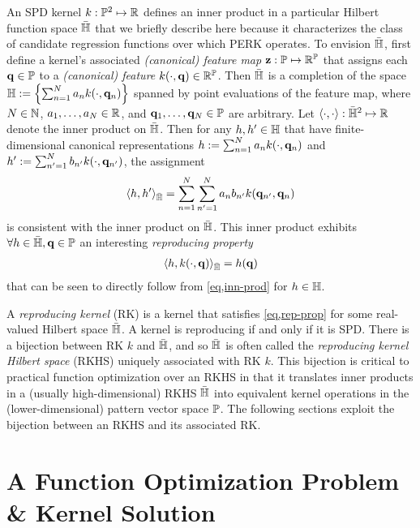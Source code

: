 An SPD kernel $k : \mathbb{P}^2 \mapsto \mathbb{R}$
defines an inner product 
in a particular Hilbert function space ${\bar{\mathbb{H}}}$
that we briefly describe here
because it characterizes
the class of candidate regression functions
over which PERK operates.
To envision ${\bar{\mathbb{H}}}$,
first define a kernel's associated \emph{(canonical) feature map} 
$\mathbf{z} : \mathbb{P} \mapsto \mathbb{R}^{\mathbb{P}}$
that assigns each $\mathbf{q} \in \mathbb{P}$ 
to a \emph{(canonical) feature} $k\paren{\cdot,\bmq} \in \reals{\setQ}$.
Then ${\bar{\mathbb{H}}}$ is a completion 
of the space $\setH := \set{\sum_{n=1}^N a_n k\paren{\cdot,\bmq_n}}$
spanned by point evaluations
of the feature map,
where
$N \in \mathbb{N}$,
$a_1,\dots,a_N \in \mathbb{R}$,
and
$\mathbf{q}_1,\dots,\mathbf{q}_N \in \mathbb{P}$ are arbitrary.
Let $\langle \cdot,\cdot \rangle : {\bar{\mathbb{H}}}^2 \mapsto \mathbb{R}$ 
denote the inner product on ${\bar{\mathbb{H}}}$.
Then for any $h,h' \in \mathbb{H}$
that have finite-dimensional canonical representations
$h := \sum_{n=1}^N a_n k\paren{\cdot,\bmq_n}$ 
and
$h' := \sum_{n'=1}^N b_{n'} k\paren{\cdot,\bmq_{n'}}$,
the assignment
\begin{align}
	\innprod{h}{h'}_\rkhs =
		\sum_{n=1}^N \sum_{n'=1}^N a_n b_{n'} k\paren{\bmq_{n'},\bmq_n}
	\label{eq,inn-prod}
\end{align}
is consistent
with the inner product on ${\bar{\mathbb{H}}}$.
This inner product exhibits $\forall h\in{\bar{\mathbb{H}}}, \mathbf{q}\in\mathbb{P}$
an interesting \emph{reproducing property}
\begin{align}
	\innprod{h}{k\paren{\cdot,\bmq}}_\rkhs = h\paren{\bmq}
	\label{eq,rep-prop}
\end{align}
that can be seen to directly follow 
from \eqref{eq,inn-prod}
for $h \in \mathbb{H}$.

A \emph{reproducing kernel} (RK) is a kernel 
that satisfies \eqref{eq,rep-prop}
for some real-valued Hilbert space ${\bar{\mathbb{H}}}$.
A kernel is reproducing if and only if it is SPD.
There is a bijection between RK $k$ and ${\bar{\mathbb{H}}}$,
and so ${\bar{\mathbb{H}}}$ is often called
the \emph{reproducing kernel Hilbert space} (RKHS)
uniquely associated with RK $k$.
This bijection is critical
to practical function optimization over an RKHS
in that it translates inner products 
in a (usually high-dimensional) RKHS ${\bar{\mathbb{H}}}$
into equivalent kernel operations 
in the (lower-dimensional) pattern vector space $\mathbb{P}$.
The following sections exploit 
the bijection between an RKHS 
and its associated RK.

\section{A Function Optimization Problem \& Kernel Solution}
\label{s,perk,meth}

